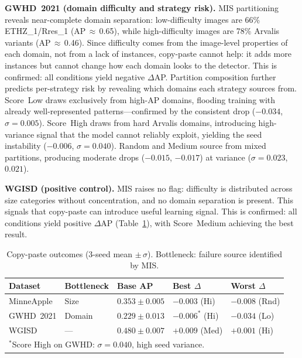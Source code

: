 \documentclass[conference]{IEEEtran}
\begin{document}
\textbf{GWHD~2021 (domain difficulty and strategy risk).}
MIS partitioning reveals near-complete domain separation:
low-difficulty images are 66\%  ETHZ\_1/Rres\_1
(AP\,${\approx}$\,0.65), while high-difficulty images are
78\% Arvalis variants (AP\,${\approx}$\,0.46).
Since difficulty comes from the image-level properties of
each domain, not from a lack of instances, copy-paste
cannot help: it adds more instances but cannot change
how each domain looks to the detector.
This is confirmed: all conditions yield negative $\Delta$AP.
Partition composition further predicts per-strategy risk
by revealing which domains each strategy sources from.
Score~Low draws exclusively from high-AP domains, flooding
training with already well-represented patterns---confirmed by
the consistent drop ($-0.034$, $\sigma{=}0.005$).
Score~High draws from hard Arvalis domains, introducing
high-variance signal that the model cannot reliably exploit,
yielding the seed instability ($-0.006$,
$\sigma{=}0.040$).
Random and Medium source from mixed partitions, producing
moderate drops ($-0.015$, $-0.017$) at variance
($\sigma{=}0.023$, $0.021$).

\textbf{WGISD (positive control).}
MIS raises no flag: difficulty is distributed across size
categories without concentration, and no
domain separation is present.
This signals that copy-paste can introduce useful
learning signal.
This is confirmed: all conditions yield positive $\Delta$AP
(Table~\ref{tab:outcomes}), with Score~Medium achieving
the best result.

\begin{table}[t]
\centering
\caption{Copy-paste outcomes (3-seed mean $\pm\,\sigma$).
Bottleneck:  failure source identified by MIS.}
\label{tab:outcomes}
\footnotesize
\setlength{\tabcolsep}{2.5pt}
\renewcommand{\arraystretch}{0.95}
\begin{tabular}{lllll}
\toprule
\textbf{Dataset}
  & \textbf{Bottleneck}
  & \textbf{Base AP}
  & \textbf{Best $\Delta$}
  & \textbf{Worst $\Delta$} \\
\midrule
MinneApple
  & Size
  & $0.353\pm0.005$
  & $-0.003$ (Hi)
  & $-0.008$ (Rnd) \\
GWHD~2021
  & Domain
  & $0.229\pm0.013$
  & $-0.006^{*}$ (Hi)
  & $-0.034$ (Lo) \\
WGISD
  & ---
  & $0.480\pm0.007$
  & $+0.009$ (Med)
  & $+0.001$ (Hi) \\
\bottomrule
\multicolumn{5}{l}{\scriptsize
  $^*$Score High on GWHD: $\sigma{=}0.040$, high seed variance.}
\end{tabular}
\end{table}
\end{document}
